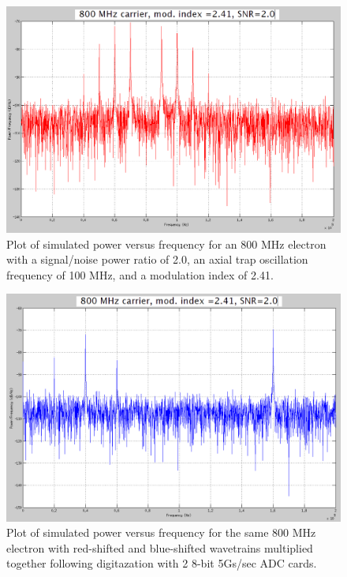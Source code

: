 \documentclass[a4paper,10pt]{article}
\begin{document}
\begin{figure}
\begin{center}
\includegraphics[scale=0.3]{Figures/800_MHz_red.png}
\end{center}
\caption[Red-shifted_PSD]%
{\narrower Plot of simulated power versus frequency for an 800 MHz electron with a signal/noise power ratio of 2.0, an axial trap oscillation frequency of 100 MHz, and a modulation index of 2.41.}
\label{red_wavetrain}
\end{figure}

\begin{figure}
\begin{center}
\includegraphics[scale=0.3]{Figures/800_MHz_prod.png}
\end{center}
\caption[Red-shifted_PSD]%
{\narrower Plot of simulated power versus frequency for the same 800 MHz electron with red-shifted and blue-shifted wavetrains multiplied together following digitazation with 2 8-bit 5Gs/sec ADC cards.}
\label{prod_wavetrain}
\end{figure}
\end{document}
